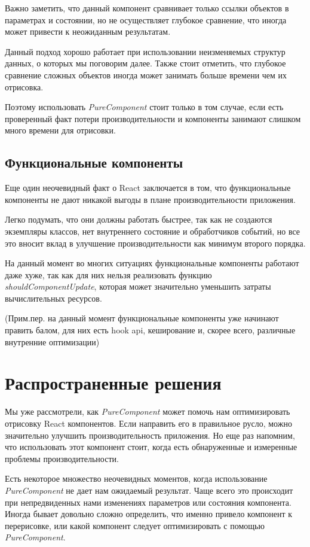 Важно заметить, что данный компонент сравнивает только ссылки объектов в параметрах и состоянии, но не осуществляет глубокое сравнение, что иногда может привести к неожиданным результатам.

Данный подход хорошо работает при использовании неизменяемых структур данных, о которых мы поговорим далее. Также стоит отметить, что глубокое сравнение сложных объектов иногда может занимать больше времени чем их отрисовка. 

Поэтому использовать \textit{PureComponent} стоит только в том случае, если есть проверенный факт потери производительности и компоненты занимают слишком много времени для отрисовки.

\subsection{Функциональные компоненты}

Еще один неочевидный факт о React заключается в том, что функциональные компоненты не дают никакой выгоды в плане производительности приложения.

Легко подумать, что они должны работать быстрее, так как не создаются экземпляры классов, нет внутреннего состояние и обработчиков событий, но все это вносит вклад в улучшение производительности как минимум второго порядка. 

На данный момент во многих ситуациях функциональные компоненты работают даже хуже, так как для них нельзя реализовать функцию \textit{shouldComponentUpdate}, которая может значительно уменьшить затраты вычислительных ресурсов.

(Прим.пер. на данный момент функциональные компоненты уже начинают править балом, для них есть hook api, кеширование и, скорее всего, различные внутренние оптимизации)

\section{Распространенные решения}

Мы уже рассмотрели, как \textit{PureComponent} может помочь нам оптимизировать отрисовку React компонентов. Если направить его в правильное русло, можно значительно улучшить производительность приложения. Но еще раз напомним, что использовать этот компонент стоит, когда есть обнаруженные и измеренные проблемы производительности.

Есть некоторое множество неочевидных моментов, когда использование \textit{PureComponent} не дает нам ожидаемый результат. Чаще всего это происходит при непредвиденных нами изменениях параметров или состояния компонента. Иногда бывает довольно сложно определить, что именно привело компонент к перерисовке, или какой компонент следует оптимизировать с помощью \textit{PureComponent}.


